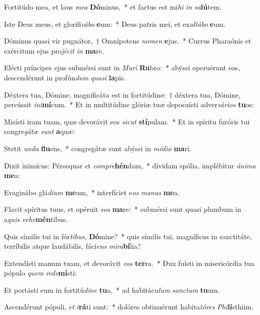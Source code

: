 \item Fortitúdo mea, et laus \textit{mea} \textbf{Dó}minus,~* et factus est mi\textit{hi} \textit{in} \textit{sa}\textbf{lú}tem.
\item Iste Deus meus, et glorifi\textit{cábo} \textbf{e}um:~* Deus patris mei, et ex\tinyhspace\textit{altábo} \textbf{e}um.
\item Dóminus quasi vir pugnátor,~† Omnípotens \textit{nomen} \textbf{e}jus.~* Currus Pharaónis et exércitum ejus pro\textit{jécit} \textit{in} \textbf{ma}re.
\item Elécti príncipes ejus submérsi sunt in \textit{Mari} \textbf{Ru}bro:~* abýssi operuérunt eos, descendérunt in profún\textit{dum} \textit{quasi} \textbf{la}pis.
\item Déxtera tua, Dómine, magnificáta est in fortitúdine:~† déxtera tua, Dómine, percússit \textit{ini}\hspace*{-0.01em}\textbf{mí}cum.~* Et in multitúdine glóriæ tuæ deposuísti adver\textit{sários} \textbf{tu}os:
\item Misísti iram tuam, quæ devorávit eos \textit{sic\-ut} \textbf{stí}pulam.~* Et in spíritu furóris tui congre\textit{gátæ} \textit{sunt} \textbf{a}quæ:
\item Stetit \textit{unda} \textbf{flu}ens,~* congregátæ sunt abýssi in \textit{médio} \textbf{ma}ri.
\item Dixit inimícus: Pérsequar et \textit{compre}\textbf{hén}dam,~* dívidam spólia, implébitur \textit{ánima} \textbf{me}a:
\item Evaginábo glá\tinyhspace\textit{dium} \textbf{me}um,~* interf\hspace*{-0.01em}íciet e\tinyhspace\textit{os} \textit{manus} \textbf{me}a.
\item Flavit spíritus tuus, et opéruit \textit{eos} \textbf{ma}re:~* submérsi sunt quasi plumbum in a\spurhspace\textit{quis} \textit{vehe}\textbf{mén}tibus.
\item Quis símilis tui in fór\textit{tibus,} \textbf{Dó}mine?~* quis símilis tui, magníficus in sanctitáte, terríbilis atque laudábilis, fáci\textit{ens} \textit{mira}\textbf{bí}lia?
\item Extendísti manum tuam, et devorávit \textit{eos} \textbf{ter}ra.~* Dux fuísti in misericórdia tua pópulo \textit{quem} \textit{rede}\textbf{mí}sti:
\item Et portásti eum in fortitú\textit{dine} \textbf{tu}a,~* ad habitácu\spurhspace\textit{lum} \textit{sanctum} \textbf{tu}um.
\item Ascendérunt pópuli, \textit{et} \textit{i}\textbf{rá}ti sunt:~* dolóres obtinuérunt habita\tinyhspace\textit{tóres} \textit{Phi}\textbf{lí}sthiim.
